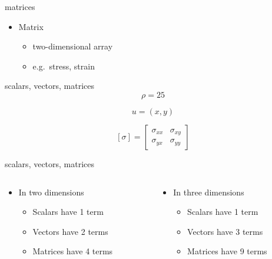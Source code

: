 \documentclass[
  letterpaper,
  ignorenonframetext,
  aspectratio=43,
  handout,
  12pt]{beamer}
\providecommand{\tightlist}{%
  \setlength{\itemsep}{0pt}\setlength{\parskip}{0pt}}
\providecommand{\tightlist}{%
\setlength{\itemsep}{0pt}\setlength{\parskip}{0pt}}
\begin{document}
\begin{frame}{matrices}
\protect\hypertarget{matrices}{}
\begin{itemize}
\tightlist
\item
  Matrix

  \begin{itemize}
  \tightlist
  \item
    two-dimensional array
  \item
    e.g.~stress, strain
  \end{itemize}
\end{itemize}
\end{frame}

\begin{frame}{scalars, vectors, matrices}
\protect\hypertarget{scalars-vectors-matrices}{}
\[\rho = 25\]

\[u = (x,y)\]

\[[\sigma] = \begin{bmatrix}
\sigma_{xx} & \sigma_{xy} \\
\sigma_{yx} & \sigma_{yy}
\end{bmatrix}\]
\end{frame}

\begin{frame}{scalars, vectors, matrices}
\protect\hypertarget{scalars-vectors-matrices-1}{}
\begin{columns}[T]
\begin{column}{0.5\textwidth}
\begin{itemize}
\tightlist
\item
  In two dimensions

  \begin{itemize}
  \tightlist
  \item
    Scalars have 1 term
  \item
    Vectors have 2 terms
  \item
    Matrices have 4 terms
  \end{itemize}
\end{itemize}
\end{column}

\begin{column}{0.5\textwidth}
\begin{itemize}
\tightlist
\item
  In three dimensions

  \begin{itemize}
  \tightlist
  \item
    Scalars have 1 term
  \item
    Vectors have 3 terms
  \item
    Matrices have 9 terms
  \end{itemize}
\end{itemize}
\end{column}
\end{columns}
\end{frame}
\end{document}
